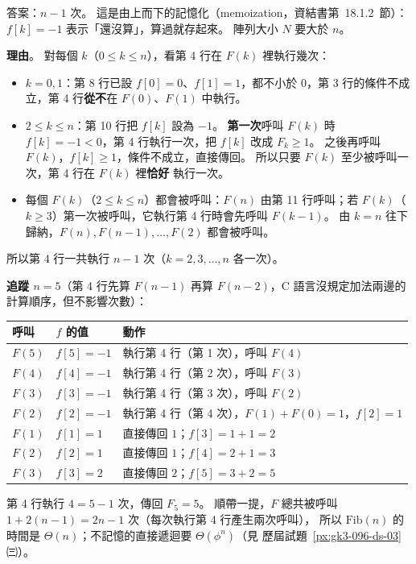 \begin{pastsoln}
答案：$n - 1$ 次。 這是由上而下的記憶化（memoization，資結書第~18.1.2~節）：$f[k] = -1$ 表示「還沒算」，算過就存起來。
陣列大小 $N$ 要大於 $n$。

\textbf{理由}。 對每個 $k$（$0 \le k \le n$），看第 4 行在 $F(k)$ 裡執行幾次：
\begin{itemize}
\item $k = 0, 1$：第 8 行已設 $f[0] = 0$、$f[1] = 1$，都不小於 $0$，第 3 行的條件不成立，第 4 行\textbf{從不}在 $F(0)$、$F(1)$ 中執行。
\item $2 \le k \le n$：第 10 行把 $f[k]$ 設為 $-1$。 \textbf{第一次}呼叫 $F(k)$ 時 $f[k] = -1 < 0$，第 4 行執行一次，把 $f[k]$ 改成
$F_k \ge 1$。 之後再呼叫 $F(k)$，$f[k] \ge 1$，條件不成立，直接傳回。 所以只要 $F(k)$ 至少被呼叫一次，第 4 行在 $F(k)$ 裡\textbf{恰好}
執行一次。
\item 每個 $F(k)$（$2 \le k \le n$）都會被呼叫：$F(n)$ 由第 11 行呼叫；若 $F(k)$（$k \ge 3$）第一次被呼叫，它執行第 4 行時會先呼叫
$F(k-1)$。 由 $k = n$ 往下歸納，$F(n), F(n-1), \ldots, F(2)$ 都會被呼叫。
\end{itemize}
所以第 4 行一共執行 $n - 1$ 次（$k = 2, 3, \ldots, n$ 各一次）。

\textbf{追蹤 $n = 5$}（第 4 行先算 $F(n-1)$ 再算 $F(n-2)$，C 語言沒規定加法兩邊的計算順序，但不影響次數）：
\begin{center}
\small
\begin{tabular}{lll}
\toprule
呼叫 & $f$ 的值 & 動作 \\
\midrule
$F(5)$ & $f[5] = -1$ & 執行第 4 行（第 1 次），呼叫 $F(4)$ \\
\quad $F(4)$ & $f[4] = -1$ & 執行第 4 行（第 2 次），呼叫 $F(3)$ \\
\qquad $F(3)$ & $f[3] = -1$ & 執行第 4 行（第 3 次），呼叫 $F(2)$ \\
\qquad\quad $F(2)$ & $f[2] = -1$ & 執行第 4 行（第 4 次），$F(1) + F(0) = 1$，$f[2] = 1$ \\
\qquad\quad $F(1)$ & $f[1] = 1$ & 直接傳回 $1$；$f[3] = 1 + 1 = 2$ \\
\quad\quad $F(2)$ & $f[2] = 1$ & 直接傳回 $1$；$f[4] = 2 + 1 = 3$ \\
\quad $F(3)$ & $f[3] = 2$ & 直接傳回 $2$；$f[5] = 3 + 2 = 5$ \\
\bottomrule
\end{tabular}
\end{center}
第 4 行執行 $4 = 5 - 1$ 次，傳回 $F_5 = 5$。 順帶一提，$F$ 總共被呼叫 $1 + 2(n-1) = 2n - 1$ 次（每次執行第 4 行產生兩次呼叫），
所以 $\mathrm{Fib}(n)$ 的時間是 $\Theta(n)$；不記憶的直接遞迴要 $\Theta(\phi^{n})$（見 歷屆試題~\ref{px:gk3-096-ds-03} ㈢）。
\end{pastsoln}
